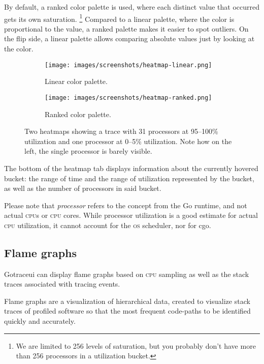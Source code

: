 \documentclass[10pt,letterpaper,oneside,openany,english]{memoir}
\begin{document}
By default, a ranked color palette is used, where each distinct value that occurred gets its own saturation.%
\footnote{We are limited to 256 levels of saturation, but you probably don't have more than 256 processors in a utilization bucket.}
Compared to a linear palette, where the color is proportional to the value, a ranked palette makes it easier to spot outliers.
On the flip side, a linear palette allows comparing absolute values just by looking at the color.

\begin{figure}[h]
  \centering
  \begin{subfigure}[b]{0.49\textwidth}
    \centering
    \texttt{[image: images/screenshots/heatmap-linear.png]}
    \caption{Linear color palette.}
  \end{subfigure}
  \hfill
  \begin{subfigure}[b]{0.49\textwidth}
    \centering
    \texttt{[image: images/screenshots/heatmap-ranked.png]}
    \caption{Ranked color palette.}
  \end{subfigure}

  \caption{Two heatmaps showing a trace with 31 processors at 95--100\% utilization and one processor at 0--5\% utilization. Note how on the left, the single processor is barely visible.}
\end{figure}

The bottom of the heatmap tab displays information about the currently hovered bucket:
the range of time and the range of utilization represented by the bucket, as well as the number of processors in said bucket.

Please note that \emph{processor} refers to the concept from the Go runtime, and not actual \textsc{cpu}s or \textsc{cpu} cores.
While processor utilization is a good estimate for actual \textsc{cpu} utilization, it cannot account for the \textsc{os} scheduler, nor for cgo.

\subsection{Flame graphs}\label{flamegraphs}

Gotraceui can display flame graphs based on \textsc{cpu} sampling as well as the stack traces associated with tracing
events.

\begin{displayquote}
  Flame graphs are a visualization of hierarchical data, created to visualize stack traces of profiled
  software so that the most frequent code-paths to be identified quickly and accurately.
\end{displayquote}
\end{document}
